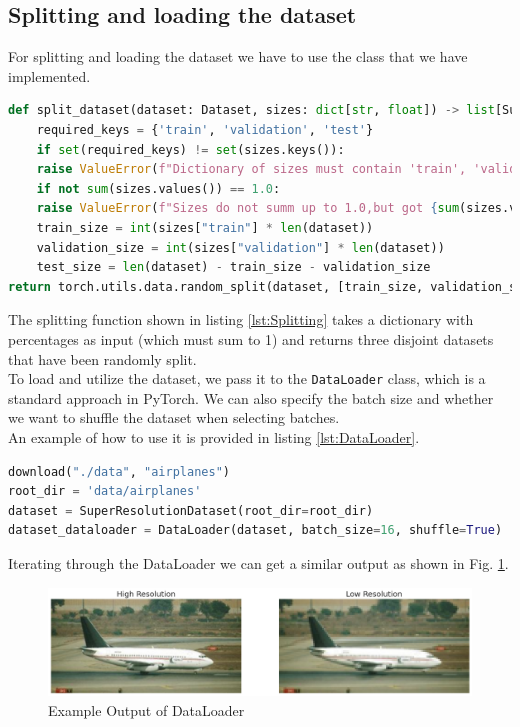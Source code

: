 \documentclass[../report.tex]{subfiles}
\begin{document}
\subsection{Splitting and loading the dataset}
For splitting and loading the dataset we have to use the class that we have implemented.
\begin{lstlisting}[style=python, language=python, label={lst:Splitting}, caption={Splitting}]
def split_dataset(dataset: Dataset, sizes: dict[str, float]) -> list[Subset]:
	required_keys = {'train', 'validation', 'test'}
	if set(required_keys) != set(sizes.keys()):
	raise ValueError(f"Dictionary of sizes must contain 'train', 'validation', and 'test' keys")
	if not sum(sizes.values()) == 1.0:
	raise ValueError(f"Sizes do not summ up to 1.0,but got {sum(sizes.values()):.2f}")
	train_size = int(sizes["train"] * len(dataset))
	validation_size = int(sizes["validation"] * len(dataset))
	test_size = len(dataset) - train_size - validation_size
return torch.utils.data.random_split(dataset, [train_size, validation_size, test_size])
\end{lstlisting}
The splitting function shown in listing \ref{lst:Splitting} takes a dictionary with percentages as input (which must sum to 1) and returns three disjoint datasets that have been randomly split.\\
To load and utilize the dataset, we pass it to the \texttt{DataLoader} class, which is a standard approach in PyTorch. We can also specify the batch size and whether we want to shuffle the dataset when selecting batches.\\
An example of how to use it is provided in listing \ref{lst:DataLoader}.
\begin{lstlisting}[style=python, language=python, label={lst:DataLoader}, caption={Example of DataLoader}]
download("./data", "airplanes")
root_dir = 'data/airplanes'
dataset = SuperResolutionDataset(root_dir=root_dir)
dataset_dataloader = DataLoader(dataset, batch_size=16, shuffle=True)
\end{lstlisting}
Iterating through the DataLoader we can get a similar output as shown in Fig. \ref{fig:example_of_output}.
\begin{figure}[H]
	\caption{Example Output of DataLoader}
	\centering
	\label{fig:example_of_output}
	\includegraphics[width=\textwidth]{../images/Example_of_Output.png}
\end{figure}
\end{document}
